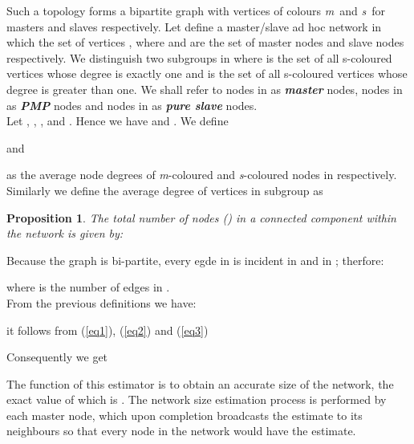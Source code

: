 \documentclass[twocolumn,10pt,conference]{IEEEtran}
\newtheorem{myprop}[thrm]{Proposition}
\begin{document}
Such a topology forms a bipartite graph with vertices of colours \textit{m}\ and \textit{s}\ for masters and slaves 
respectively. Let  define a master/slave ad hoc network in which the set of vertices , where 
 and  are the set of master nodes and slave nodes respectively. We distinguish two subgroups in 
 where  is the set of all s-coloured vertices whose degree is exactly one and  is the 
set of all s-coloured vertices whose degree is greater than one. We shall refer to nodes in  as \textit{\bf{master}} 
nodes, nodes in  as \textit{\bf{PMP}} nodes and nodes in  as \textit{\bf{pure slave}} nodes.\\
Let , , ,  and . Hence we have  and .
We define 
 
and 
 
as the average node degrees of \textit{m}-coloured and \textit{s}-coloured nodes in  respectively. Similarly we 
define the average degree of vertices in subgroup  as
 

\begin{myprop}
The total number of nodes () in a connected component within the network is given by:
\begin{center}

\label{proposition}
\end{center}
\end{myprop}


\begin{IEEEproof}
 Because the graph is bi-partite, every egde in  is incident in  and in ; therfore:
\begin{center}

\end{center}
where  is the number of edges in .\\
From the previous definitions we have:



it follows from (\ref{eq1}), (\ref{eq2}) and (\ref{eq3})
\begin{center}
 
\end{center}
Consequently we get \begin{center}
 
\end{center}
\end{IEEEproof}

The function of this estimator is to obtain an accurate size of the network, the exact value of which is . The network size estimation process is performed by each master node, which upon completion broadcasts the 
estimate to its neighbours so that every node in the network would have the estimate. 
\end{document}
